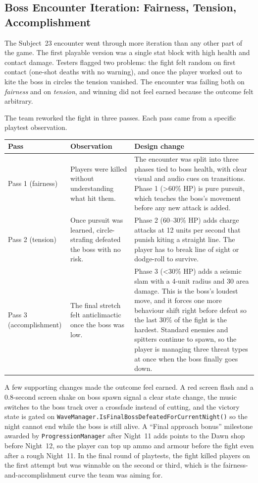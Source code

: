 \documentclass[11pt,a4paper]{article}
\begin{document}
\subsection{Boss Encounter Iteration: Fairness, Tension, Accomplishment}

The Subject~23 encounter went through more iteration than any other part of the game. The first playable version was a single stat block with high health and contact damage. Testers flagged two problems: the fight felt random on first contact (one-shot deaths with no warning), and once the player worked out to kite the boss in circles the tension vanished. The encounter was failing both on \textit{fairness} and on \textit{tension}, and winning did not feel earned because the outcome felt arbitrary.

The team reworked the fight in three passes. Each pass came from a specific playtest observation.

\begin{tcolorbox}[tableframe]
\small
\begin{tabularx}{\textwidth}{@{} p{2.3cm} p{4cm} X @{}}
\toprule
\textbf{Pass} & \textbf{Observation} & \textbf{Design change} \\
\midrule
Pass 1 (fairness) & Players were killed without understanding what hit them. & The encounter was split into three phases tied to boss health, with clear visual and audio cues on transitions. Phase 1 (>60\% HP) is pure pursuit, which teaches the boss's movement before any new attack is added. \\
\addlinespace
Pass 2 (tension) & Once pursuit was learned, circle-strafing defeated the boss with no risk. & Phase 2 (60--30\% HP) adds charge attacks at 12 units per second that punish kiting a straight line. The player has to break line of sight or dodge-roll to survive. \\
\addlinespace
Pass 3 (accomplishment) & The final stretch felt anticlimactic once the boss was low. & Phase 3 (<30\% HP) adds a seismic slam with a 4-unit radius and 30 area damage. This is the boss's loudest move, and it forces one more behaviour shift right before defeat so the last 30\% of the fight is the hardest. Standard enemies and spitters continue to spawn, so the player is managing three threat types at once when the boss finally goes down. \\
\bottomrule
\end{tabularx}
\end{tcolorbox}

A few supporting changes made the outcome feel earned. A red screen flash and a 0.8-second screen shake on boss spawn signal a clear state change, the music switches to the boss track over a crossfade instead of cutting, and the victory state is gated on \texttt{WaveManager.\-IsFinalBossDefeatedForCurrentNight()} so the night cannot end while the boss is still alive. A ``Final approach bonus'' milestone awarded by \texttt{ProgressionManager} after Night~11 adds points to the Dawn shop before Night~12, so the player can top up ammo and armour before the fight even after a rough Night~11. In the final round of playtests, the fight killed players on the first attempt but was winnable on the second or third, which is the fairness-and-accomplishment curve the team was aiming for.
\end{document}
